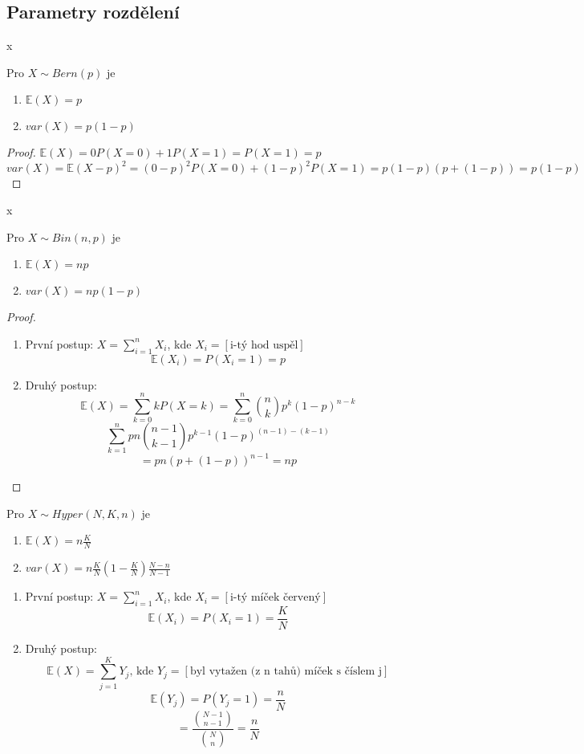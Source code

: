 \documentclass[../main.tex]{subfiles}
\begin{document}
\subsection{Parametry rozdělení}
\begin{theorem}
    {\color{white} x}

    Pro $X\sim Bern(p)$ je 
    \begin{enumerate}
        \item $\mathbb{E}(X) = p$
        \item $var(X) = p(1-p)$
    \end{enumerate}
\end{theorem}
\begin{proof}
    $\mathbb{E}(X) = 0P(X=0)+1P(X=1) = P(X=1) = p$\\
    $var(X) = \mathbb{E}(X-p)^2 = (0-p)^2P(X=0) + (1-p)^2P(X=1) = p(1-p)(p+(1-p)) = p(1-p)$
\end{proof}

\begin{theorem}
    {\color{white} x}

    Pro $X\sim Bin(n,p)$ je
    \begin{enumerate}
        \item $\mathbb{E}(X) = np$
        \item $var(X) = np(1-p)$
    \end{enumerate}
\end{theorem}
\begin{proof}
    \begin{enumerate}
        \item První postup: $X = \sum^n_{i=1}X_i$, kde $X_i = [\text{i-tý hod uspěl}]$
        \[\mathbb{E}(X_i) = P(X_i = 1) = p\]
        \item Druhý postup:
        \[\mathbb{E}(X) = \sum^n_{k=0} kP(X=k) = \sum^n_{k=0}\binom{n}{k}p^k(1-p)^{n-k}\]
        \[\sum_{k=1}^n pn \binom{n-1}{k-1}p^{k-1}(1-p)^{(n-1) - (k-1)}\]
        \[ = pn (p + (1-p))^{n-1} = np\]
    \end{enumerate}
\end{proof}

\begin{theorem}
    Pro $X\sim Hyper(N,K,n)$ je
    \begin{enumerate}
        \item $\mathbb{E}(X) = n\frac{K}{N}$
        \item $var(X) = n\frac{K}{N}(1-\frac{K}{N})\frac{N-n}{N-1}$
    \end{enumerate}
    \begin{enumerate}
        \item První postup: $X = \sum^n_{i=1}X_i$, kde $X_i = [\text{i-tý míček červený}]$
        \[\mathbb{E}(X_i) = P(X_i = 1) = \frac{K}{N}\]
        \item Druhý postup:
        \[\mathbb{E}(X) = \sum^K_{j=1} Y_j\text{, kde } Y_j = [\text{byl vytažen (z n tahů) míček s číslem j}]\]
        \[\mathbb{E}(Y_j) = P(Y_j = 1) = \frac{n}{N} \]
        \[= \frac{\binom{N-1}{n-1}}{\binom{N}{n}} = \frac{n}{N}\]
    \end{enumerate}
\end{theorem}
\end{document}
